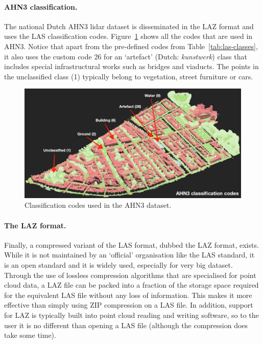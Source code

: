 \paragraph{AHN3 classification.} The national Dutch AHN3 lidar dataset is disseminated in the LAZ format and uses the LAS classification codes. Figure~\ref{fig:ahn3} shows all the codes that are used in  AHN3. Notice that apart from the pre-defined codes from Table~\ref{tab:las-classes}, it also uses the custom code $26$ for an `artefact' (Dutch: \emph{kunstwerk}) class that includes special infrastructural works such as bridges and viaducts. The points in the unclassified class (1) typically belong to vegetation, street furniture or cars.
\begin{figure}
  \includegraphics[width=\linewidth]{figs/ahn3.png}
  \caption{Classification codes used in the AHN3 dataset.}%
\label{fig:ahn3}
\end{figure}



\paragraph{The LAZ format.}%

Finally, a compressed variant of the LAS format, dubbed the LAZ format, exists.
While it is not maintained by an `official' organisation like the LAS standard, it is an open standard and it is widely used, especially for very big dataset.
Through the use of lossless compression algorithms that are specialised for point cloud data, a LAZ file can be packed into a fraction of the storage space required for the equivalent LAS file without any loss of information.
This makes it more effective than simply using ZIP compression on a LAS file.
In addition, support for LAZ is typically built into point cloud reading and writing software, so to the user it is no different than opening a LAS file (although the compression does take some time).

